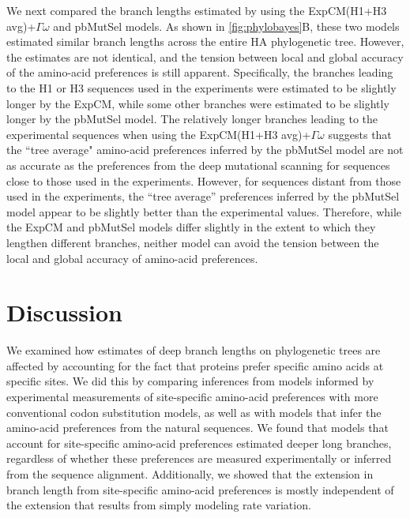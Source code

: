 \documentclass[11pt]{article}
\begin{document}
We next compared the branch lengths estimated by using the ExpCM(H1+H3 avg)+$\Gamma\omega$ and pbMutSel models.
As shown in \ref{fig:phylobayes}B, these two models estimated similar branch lengths across the entire HA phylogenetic tree. 
However, the estimates are not identical, and the tension between local and global accuracy of the amino-acid preferences is still apparent. 
Specifically, the branches leading to the H1 or H3 sequences used in the experiments were estimated to be slightly longer by the ExpCM, while some other branches were estimated to be slightly longer by the pbMutSel model. 
The relatively longer branches leading to the experimental sequences when using the ExpCM(H1+H3 avg)+$\Gamma\omega$ suggests that the ``tree average" amino-acid preferences inferred by the pbMutSel model are not as accurate as the preferences from the deep mutational scanning for sequences close to those used in the experiments. 
However, for sequences distant from those used in the experiments, the ``tree average'' preferences inferred by the pbMutSel model appear to be slightly better than the experimental values.
Therefore, while the ExpCM and pbMutSel models differ slightly in the extent to which they lengthen different branches, neither model can avoid the tension between the local and global accuracy of amino-acid preferences. 

\section*{Discussion}
 
We examined how estimates of deep branch lengths on phylogenetic trees are affected by accounting for the fact that proteins prefer specific amino acids at specific sites. 
We did this by comparing inferences from models informed by experimental measurements of site-specific amino-acid preferences with more conventional codon substitution models, as well as with models that infer the amino-acid preferences from the natural sequences.
We found that models that account for site-specific amino-acid preferences estimated deeper long branches, regardless of whether these preferences are measured experimentally or inferred from the sequence alignment.
Additionally, we showed that the extension in branch length from site-specific amino-acid preferences is mostly independent of the extension that results from simply modeling rate variation. 
\end{document}
